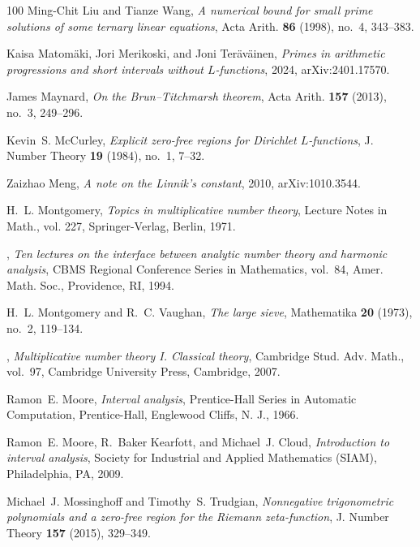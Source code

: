 \documentclass[11pt]{amsart}
\numberwithin{equation}{section}
\theoremstyle{plain}
\theoremstyle{definition}
\theoremstyle{remark}
\newcommand{\1}{\mathbf{1}}
\begin{document}
\begin{thebibliography}{100}
Ming-Chit Liu and Tianze Wang, \emph{A numerical bound for small prime
  solutions of some ternary linear equations}, Acta Arith. \textbf{86} (1998),
  no.~4, 343--383.

Kaisa Matom{\"a}ki, Jori Merikoski, and Joni Ter{\"a}v{\"a}inen, \emph{Primes
  in arithmetic progressions and short intervals without {$L$}-functions},
  2024, arXiv:2401.17570.

James Maynard, \emph{On the {B}run--{T}itchmarsh theorem}, Acta Arith.
  \textbf{157} (2013), no.~3, 249--296.

Kevin~S. McCurley, \emph{Explicit zero-free regions for {D}irichlet
  {$L$}-functions}, J. Number Theory \textbf{19} (1984), no.~1, 7--32.

Zaizhao Meng, \emph{A note on the {L}innik's constant}, 2010, arXiv:1010.3544.

H.~L. Montgomery, \emph{Topics in multiplicative number theory}, Lecture Notes
  in Math., vol. 227, Springer-Verlag, Berlin, 1971.

\bysame, \emph{Ten lectures on the interface between analytic number theory and
  harmonic analysis}, CBMS Regional Conference Series in Mathematics, vol.~84,
  Amer. Math. Soc., Providence, RI, 1994.

H.~L. Montgomery and R.~C. Vaughan, \emph{The large sieve}, Mathematika
  \textbf{20} (1973), no.~2, 119--134.

\bysame, \emph{Multiplicative number theory {I}. {C}lassical theory}, Cambridge
  Stud. Adv. Math., vol.~97, Cambridge University Press, Cambridge, 2007.

Ramon~E. Moore, \emph{Interval analysis}, Prentice-Hall Series in Automatic
  Computation, Prentice-Hall, Englewood Cliffs, N. J., 1966.

Ramon~E. Moore, R.~Baker Kearfott, and Michael~J. Cloud, \emph{Introduction to
  interval analysis}, Society for Industrial and Applied Mathematics (SIAM),
  Philadelphia, PA, 2009.

Michael~J. Mossinghoff and Timothy~S. Trudgian, \emph{Nonnegative trigonometric
  polynomials and a zero-free region for the {R}iemann zeta-function}, J.
  Number Theory \textbf{157} (2015), 329--349.


\end{thebibliography}
\end{document}
